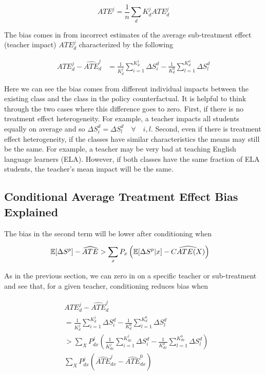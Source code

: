 \documentclass[12pt]{article}
\theoremstyle{definition}
\theoremstyle{definition}
\theoremstyle{definition}
\theoremstyle{definition}
\begin{document}
    \begin{equation*}
       ATE^j = \frac{1}{n}\sum_d K^j_d ATE^j_d
    \end{equation*}  

    The bias comes in from incorrect estimates of the average sub-treatment effect (teacher impact) $ATE^j_d$ characterized by the following 

    \begin{align*}
        ATE^j_d - \widehat{ATE}^j_d & = \frac{1}{K^j_d} \sum_{i = 1}^{K^j_d} \Delta S_i^d - \frac{1}{K^0_d} \sum_{l = 1}^{K^0_d} \Delta S_l^d
    \end{align*}
    
    Here we can see the bias comes from different individual impacts between the existing class and the class in the policy counterfactual. It is helpful to think through the two cases where this difference goes to zero. First, if there is no treatment effect heterogeneity. For example, a teacher impacts all students equally on average and so $\Delta S_i^d = \Delta S_l^d \quad \forall \quad i,l$. Second, even if there is treatment effect heterogeneity, if the classes have similar characteristics the means may still be the same. For example, a teacher may be very bad at teaching English language learners (ELA). However, if both classes have the same fraction of ELA students, the teacher's mean impact will be the same. 

    \subsection{Conditional Average Treatment Effect Bias Explained}
    \label{CATE_bias_appendix}

     The bias in the second term will be lower after conditioning when 
    
    \begin{align}
        & \mathbb{E}[\Delta S^p]-\widehat{ATE} > \sum_{x} P_x \left( \mathbb{E}[\Delta S^p|x]-\widehat{CATE(X)} \right) 
    \end{align}

    As in the previous section, we can zero in on a specific teacher or sub-treatment and see that, for a given teacher, conditioning reduces bias when 
    
    \begin{align}
     & ATE^j_d - \widehat{ATE}^j_d \\
        &  = \frac{1}{K^j_d} \sum_{i = 1}^{K^j_d} \Delta S_i^d - \frac{1}{K^0_d} \sum_{l = 1}^{K^0_d} \Delta S_l^d \\
        & > \sum_X P^j_{dx} \left( \frac{1}{K^j_{dx}} \sum_{i = 1}^{K^j_{dx}} \Delta S_i^d - \frac{1}{K^0_{dx}} \sum_{l = 1}^{K^0_{dx}} \Delta S_l^d \right) \\
        &  \sum_X P^j_{dx} \left( \widehat{ATE}^j_{dx} - \widehat{ATE}^0_{dx}  \right) 
    \end{align}
\end{document}
